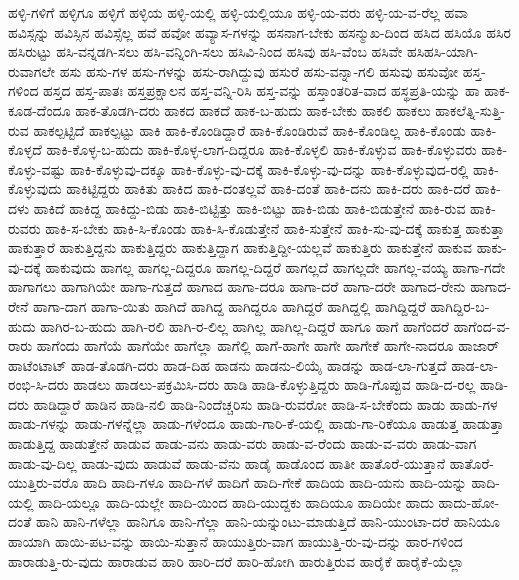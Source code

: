 ಹಳ್ಳಿ-ಗಳಿಗೆ
ಹಳ್ಳಿಗೂ
ಹಳ್ಳಿಗೆ
ಹಳ್ಳಿಯ
ಹಳ್ಳಿ-ಯಲ್ಲಿ
ಹಳ್ಳಿ-ಯಲ್ಲಿಯೂ
ಹಳ್ಳಿ-ಯ-ವರು
ಹಳ್ಳಿ-ಯ-ವ-ರೆಲ್ಲ
ಹವಾ
ಹವಿಸ್ಸನ್ನು
ಹವಿಸ್ಸಿನ
ಹವಿಸ್ಸೆಲ್ಲ
ಹವೆ
ಹವೋ
ಹವ್ಯಾಸ-ಗಳನ್ನು
ಹಸನಾಗ-ಬೇಕು
ಹಸನ್ಮುಖ-ದಿಂದ
ಹಸಿದ
ಹಸಿಯೊ
ಹಸಿರ
ಹಸಿರುಟ್ಟು
ಹಸಿ-ವನ್ನಡಗಿ-ಸಲು
ಹಸಿ-ವನ್ನಿಂಗಿ-ಸಲು
ಹಸಿವಿ-ನಿಂದ
ಹಸಿವು
ಹಸಿ-ವೆಂಬ
ಹಸಿವೇ
ಹಸಿಹಸಿ-ಯಾಗಿ-ರುವಾಗಲೇ
ಹಸು
ಹಸು-ಗಳ
ಹಸು-ಗಳನ್ನು
ಹಸು-ರಾಗಿದ್ದುವು
ಹಸುರೆ
ಹಸು-ವನ್ನಾ-ಗಲಿ
ಹಸುವು
ಹಸುವೋ
ಹಸ್ತ-ಗಳಿಂದ
ಹಸ್ತದ
ಹಸ್ತ-ಪಾತಃ
ಹಸ್ತಪ್ರಕ್ಷಾಲನ
ಹಸ್ತ-ವನ್ನಿ-ರಿಸಿ
ಹಸ್ತ-ವನ್ನು
ಹಸ್ತಾಂತರಿತ-ವಾದ
ಹಸ್ಥಪ್ರತಿ-ಯನ್ನು
ಹಾ
ಹಾಕ-ಕೂಡ-ದೆಂದೂ
ಹಾಕ-ತೊಡಗಿ-ದರು
ಹಾಕದ
ಹಾಕದೆ
ಹಾಕ-ಬ-ಹುದು
ಹಾಕ-ಬೇಕು
ಹಾಕಲಿ
ಹಾಕಲು
ಹಾಕಲೆತ್ನಿ-ಸುತ್ತಿ-ರುವ
ಹಾಕಲ್ಪಟ್ಟಿದೆ
ಹಾಕಲ್ಪಟ್ಟು
ಹಾಕಿ
ಹಾಕಿ-ಕೊಂಡಿದ್ದಾರೆ
ಹಾಕಿ-ಕೊಂಡಿರುವೆ
ಹಾಕಿ-ಕೊಂಡಿಲ್ಲ
ಹಾಕಿ-ಕೊಂಡು
ಹಾಕಿ-ಕೊಳ್ಳದೆ
ಹಾಕಿ-ಕೊಳ್ಳ-ಬ-ಹುದು
ಹಾಕಿ-ಕೊಳ್ಳ-ಲಾಗ-ದಿದ್ದರೂ
ಹಾಕಿ-ಕೊಳ್ಳಲಿ
ಹಾಕಿ-ಕೊಳ್ಳುವ
ಹಾಕಿ-ಕೊಳ್ಳುವರು
ಹಾಕಿ-ಕೊಳ್ಳು-ವಷ್ಟು
ಹಾಕಿ-ಕೊಳ್ಳುವು-ದಕ್ಕೂ
ಹಾಕಿ-ಕೊಳ್ಳು-ವು-ದಕ್ಕೆ
ಹಾಕಿ-ಕೊಳ್ಳು-ವು-ದನ್ನು
ಹಾಕಿ-ಕೊಳ್ಳುವುದ-ರಲ್ಲಿ
ಹಾಕಿ-ಕೊಳ್ಳುವುದು
ಹಾಕಿಟ್ಟಿದ್ದರು
ಹಾಕಿತು
ಹಾಕಿದ
ಹಾಕಿ-ದಂತಲ್ಲವೆ
ಹಾಕಿ-ದಂತೆ
ಹಾಕಿ-ದನು
ಹಾಕಿ-ದರು
ಹಾಕಿ-ದರೆ
ಹಾಕಿ-ದಳು
ಹಾಕಿದೆ
ಹಾಕಿದ್ದ
ಹಾಕಿದ್ದು-ಬಿಡು
ಹಾಕಿ-ಬಿಟ್ಟಿತ್ತು
ಹಾಕಿ-ಬಿಟ್ಟು
ಹಾಕಿ-ಬಿಡು
ಹಾಕಿ-ಬಿಡುತ್ತೇನೆ
ಹಾಕಿ-ರುವ
ಹಾಕಿ-ರುವರು
ಹಾಕಿ-ಸ-ಬೇಕು
ಹಾಕಿ-ಸಿ-ಕೊಂಡು
ಹಾಕಿ-ಸಿ-ಕೊಡುತ್ತೇನೆ
ಹಾಕಿ-ಸುತ್ತೇನೆ
ಹಾಕಿ-ಸು-ವು-ದಕ್ಕೆ
ಹಾಕುತ್ತ
ಹಾಕುತ್ತಾ
ಹಾಕುತ್ತಾರೆ
ಹಾಕುತ್ತಿದ್ದನು
ಹಾಕುತ್ತಿದ್ದರು
ಹಾಕುತ್ತಿದ್ದಾಗ
ಹಾಕುತ್ತಿದ್ದೀ-ಯಲ್ಲವೆ
ಹಾಕುತ್ತಿರು
ಹಾಕುತ್ತೇನೆ
ಹಾಕುವ
ಹಾಕು-ವು-ದಕ್ಕೆ
ಹಾಕುವುದು
ಹಾಗಲ್ಲ
ಹಾಗಲ್ಲ-ದಿದ್ದರೂ
ಹಾಗಲ್ಲ-ದಿದ್ದರೆ
ಹಾಗಲ್ಲದೆ
ಹಾಗಲ್ಲದೇ
ಹಾಗಲ್ಲ-ವಯ್ಯ
ಹಾಗಾ-ಗದೇ
ಹಾಗಾಗಲು
ಹಾಗಾಗಿಯೇ
ಹಾಗಾ-ಗುತ್ತದೆ
ಹಾಗಾದ
ಹಾಗಾ-ದರೂ
ಹಾಗಾ-ದರೆ
ಹಾಗಾ-ದರೇ
ಹಾಗಾದ-ರೇನು
ಹಾಗಾದ-ರೇನೆ
ಹಾಗಾ-ದಾಗ
ಹಾಗಾ-ಯಿತು
ಹಾಗಿದೆ
ಹಾಗಿದ್ದ
ಹಾಗಿದ್ದರೂ
ಹಾಗಿದ್ದರೆ
ಹಾಗಿದ್ದಲ್ಲಿ
ಹಾಗಿದ್ದಿದ್ದರೆ
ಹಾಗಿದ್ದಿರ-ಬ-ಹುದು
ಹಾಗಿರ-ಬ-ಹುದು
ಹಾಗಿ-ರಲಿ
ಹಾಗಿ-ರ-ಲಿಲ್ಲ
ಹಾಗಿಲ್ಲ
ಹಾಗಿಲ್ಲ-ದಿದ್ದರೆ
ಹಾಗೂ
ಹಾಗೆ
ಹಾಗೆಂದರೆ
ಹಾಗೆಂದ-ವ-ರಾರು
ಹಾಗೆಂದು
ಹಾಗೆಯೆ
ಹಾಗೆಯೇ
ಹಾಗೆಲ್ಲಾ
ಹಾಗೆಲ್ಲಿ
ಹಾಗೆ-ಹಾಗೇ
ಹಾಗೇ
ಹಾಗೇಕೆ
ಹಾಗೇ-ನಾದರೂ
ಹಾಜಾರ್
ಹಾಟೆಂಟಾಟ್
ಹಾಡ-ತೊಡಗಿ-ದರು
ಹಾಡ-ದಿಹ
ಹಾಡನು
ಹಾಡನು-ಲಿಯೈ
ಹಾಡನ್ನು
ಹಾಡ-ಲಾ-ಗುತ್ತದೆ
ಹಾಡ-ಲಾ-ರಂಭಿ-ಸಿ-ದರು
ಹಾಡಲು
ಹಾಡಲು-ಪಕ್ರಮಿಸಿ-ದರು
ಹಾಡಿ
ಹಾಡಿ-ಕೊಳ್ಳುತ್ತಿದ್ದರು
ಹಾಡಿ-ಗೊಪ್ಪುವ
ಹಾಡಿ-ದ-ರಲ್ಲ
ಹಾಡಿ-ದರು
ಹಾಡಿದ್ದಾರೆ
ಹಾಡಿನ
ಹಾಡಿ-ನಲಿ
ಹಾಡಿ-ನಿಂದೆಚ್ಚರಿಸು
ಹಾಡಿ-ರುವರೋ
ಹಾಡಿ-ಸ-ಬೇಕೆಂದು
ಹಾಡು
ಹಾಡು-ಗಳ
ಹಾಡು-ಗಳನ್ನು
ಹಾಡು-ಗಳನ್ನೆಲ್ಲಾ
ಹಾಡು-ಗಳೆಂದೂ
ಹಾಡು-ಗಾರಿ-ಕೆ-ಯಲ್ಲಿ
ಹಾಡು-ಗಾ-ರಿಕೆಯೂ
ಹಾಡುತ್ತ
ಹಾಡುತ್ತಾ
ಹಾಡುತ್ತಿದ್ದ
ಹಾಡುತ್ತೇನೆ
ಹಾಡುವ
ಹಾಡು-ವನು
ಹಾಡು-ವರು
ಹಾಡು-ವ-ರೆಂದು
ಹಾಡು-ವ-ವರು
ಹಾಡು-ವಾಗ
ಹಾಡು-ವು-ದಿಲ್ಲ
ಹಾಡು-ವುದು
ಹಾಡುವೆ
ಹಾಡು-ವೆನು
ಹಾಡೈ
ಹಾಡೊಂದ
ಹಾತೀ
ಹಾತೊರೆ-ಯುತ್ತಾನೆ
ಹಾತೊರೆ-ಯುತ್ತಿರು-ವರೊ
ಹಾದಿ
ಹಾದಿ-ಗಳೂ
ಹಾದಿ-ಗಳೆ
ಹಾದಿಗೆ
ಹಾದಿ-ಗೇಕೆ
ಹಾದಿಯ
ಹಾದಿ-ಯನು
ಹಾದಿ-ಯನ್ನು
ಹಾದಿ-ಯಲ್ಲಿ
ಹಾದಿ-ಯಲ್ಲೂ
ಹಾದಿ-ಯಲ್ಲೇ
ಹಾದಿ-ಯಿಂದ
ಹಾದಿ-ಯುದ್ದಕು
ಹಾದಿಯೂ
ಹಾದಿಯೇ
ಹಾದು
ಹಾದು-ಹೋ-ದಂತೆ
ಹಾನಿ
ಹಾನಿ-ಗಳೆಲ್ಲಾ
ಹಾನಿಗೂ
ಹಾನಿ-ಗೆಲ್ಲಾ
ಹಾನಿ-ಯನ್ನುಂಟು-ಮಾಡುತ್ತಿದೆ
ಹಾನಿ-ಯುಂಟಾ-ದರೆ
ಹಾನಿಯೂ
ಹಾಯಾಗಿ
ಹಾಯಿ-ಪಟ-ವನ್ನು
ಹಾಯಿ-ಸುತ್ತಾನೆ
ಹಾಯುತ್ತಿರು-ವಾಗ
ಹಾಯುತ್ತಿ-ರು-ವು-ದನ್ನು
ಹಾರ-ಗಳಿಂದ
ಹಾರಾಡುತ್ತಿ-ರು-ವುದು
ಹಾರಾಡುವ
ಹಾರಿ
ಹಾರಿ-ದರೆ
ಹಾರಿ-ಹೋಗಿ
ಹಾರುತ್ತಿರುವ
ಹಾರೈಕೆ
ಹಾರೈಕೆ-ಯೆಲ್ಲಾ
